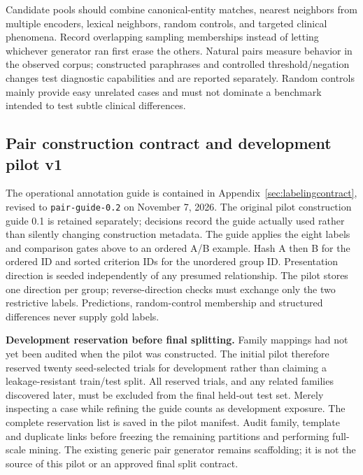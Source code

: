 \documentclass[10pt,letterpaper]{article}
\newcommand{\pathcode}[1]{\nolinkurl{#1}}
\begin{document}
Candidate pools should combine canonical-entity matches, nearest neighbors
from multiple encoders, lexical neighbors, random controls, and targeted
clinical phenomena. Record overlapping sampling memberships instead of
letting whichever generator ran first erase the others. Natural pairs measure
behavior in the observed corpus; constructed paraphrases and controlled
threshold/negation changes test diagnostic capabilities and are reported
separately. Random controls mainly provide easy unrelated cases and must not
dominate a benchmark intended to test subtle clinical differences.

\subsection{Pair construction contract and development pilot v1}
\label{sec:pairpilot}
The operational annotation guide is contained in Appendix~\ref{sec:labelingcontract},
revised to \pathcode{pair-guide-0.2} on November 7, 2026. The original pilot
construction guide 0.1 is retained separately; decisions record the guide
actually used rather than silently changing construction metadata.
The guide applies the eight labels and comparison
gates above to an ordered A/B example. Hash A then B for the ordered ID and
sorted criterion IDs for the unordered group ID. Presentation direction is
seeded independently of any presumed relationship. The pilot stores one
direction per group; reverse-direction checks must exchange only the two
restrictive labels. Predictions, random-control membership and structured
differences never supply gold labels.

\textbf{Development reservation before final splitting.} Family mappings
had not yet been audited when the pilot was constructed. The initial pilot therefore reserved twenty
seed-selected trials for development rather than claiming a leakage-resistant
train/test split. All reserved trials, and any related families discovered
later, must be excluded from the final held-out test set. Merely inspecting
a case while refining the guide counts as development exposure. The complete
reservation list is saved in the pilot manifest. Audit family, template and
duplicate links before freezing the remaining partitions and performing
full-scale mining. The existing generic pair generator remains scaffolding;
it is not the source of this pilot or an approved final split contract.
\end{document}
